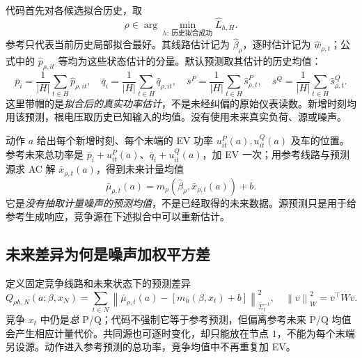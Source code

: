 \documentclass[UTF8,fontset=fandol,11pt,a4paper]{ctexart}
\newcommand{\norm}[1]{\left\lVert#1\right\rVert}
\begin{document}
代码首先对各候选拟合历史，取
\begin{equation}
 \rho\in\arg\min_{h:\ \text{历史拟合成功}}\widehat L_{h,H}.
 \label{eq:reference}
\end{equation}
参考只代表当前历史局部拟合最好。其线路估计记为 $\widehat\beta_\rho$，逐时估计记为 $\widehat w_{\rho,t}$；公式中的 $\widehat p_{\rho,it}$ 等均为这些状态估计的分量。默认预测取其估计的历史均值：
\[
 \bar p_i=\frac1{|H|}\sum_{t\in H}\widehat p_{\rho,it},
 \quad\bar q_i=\frac1{|H|}\sum_{t\in H}\widehat q_{\rho,it},
 \quad\bar s^P=\frac1{|H|}\sum_{t\in H}\widehat s^P_{\rho,t},
 \quad\bar s^Q=\frac1{|H|}\sum_{t\in H}\widehat s^Q_{\rho,t}.
\]
这里带帽的是\emph{拟合后的真实功率估计}，不是未经纠偏的原始仪表读数。新增时刻均用该预测，根电压取历史已知输入的均值。没有使用未来真实负荷、源或噪声。

动作 $a$ 给出每个新增时刻、每个末端的 EV 功率
$u^P_{it}(a),u^Q_{it}(a)$ 及车的位置。参考未来总功率是
$\bar p_i+u^P_{it}(a)$、$\bar q_i+u^Q_{it}(a)$，加 EV 一次；用参考线路与预测源求 AC 解 $\bar x_{\rho,t}(a)$，得到未来计量均值
\begin{equation}
 \bar\mu_{\rho,t}(a)=
       m_\rho(\widehat\beta_\rho,\bar x_{\rho,t}(a))+b .
 \label{eq:forecastmean}
\end{equation}
它是\emph{没有抽取计量噪声的预测均值}，不是已经取得的未来数据。源预测只是用于给参考生成响应，竞争源在下述拟合中可以重新估计。

\subsection{未来差异为何是噪声加权平方差}
定义固定竞争线路和未来状态下的预测差异
\begin{equation}
 Q_{\rho h,N}(a;\beta,x_N)=
 \sum_{t\in N}
 \norm{\bar\mu_{\rho,t}(a)-[m_h(\beta,x_t)+b]}_{\Sigma_t^{-1}}^2,
 \quad \norm{v}_W^2=v^\top Wv .
 \label{eq:futureQ}
\end{equation}
竞争 $x_t$ 中仍是\emph{总} P/Q；代码不强制它等于参考预测，但偏离参考未来 P/Q 均值会产生相应计量代价。共同源也可逐时变化，却只能放在节点 $1$，不能为每个末端另设源。动作进入参考预测的总功率，竞争均值中不再重复加 EV。
\end{document}
